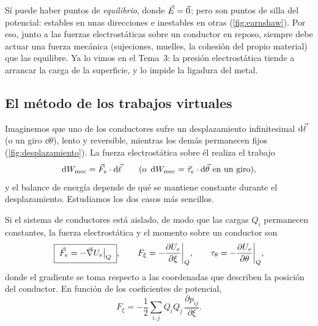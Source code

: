 \begin{observacion}\label{obs:silla}
Sí puede haber puntos de \emph{equilibrio}, donde $\vec E=\vec 0$; pero son puntos de silla del potencial: estables en unas direcciones e inestables
en otras (\cref{fig:earnshaw}). Por eso, junto a las fuerzas electrostáticas sobre un conductor en reposo, siempre debe actuar una fuerza
mecánica (sujeciones, muelles, la cohesión del propio material) que las equilibre. Ya lo vimos en el Tema~3: la presión electrostática tiende a
arrancar la carga de la superficie, y lo impide la ligadura del metal.
\end{observacion}



\subsection{El método de los trabajos virtuales}

Imaginemos que uno de los conductores sufre un desplazamiento infinitesimal $\mathop{}\!\mathrm{d}\vec\ell$ (o un giro $\dd\theta$), lento y reversible, mientras los
demás permanecen fijos (\cref{fig:desplazamiento}). La fuerza electrostática sobre él realiza el trabajo
\begin{equation}\label{eq:trabajo-mec}
  \mathop{}\!\mathrm{d}W_{\mathrm{mec}}=\vec F_e\cdot\mathop{}\!\mathrm{d}\vec\ell \qquad(\text{o } \mathop{}\!\mathrm{d}W_{\mathrm{mec}}=\vec\tau_e\cdot\mathop{}\!\mathrm{d}\vec\theta \text{ en un giro}),
\end{equation}
y el balance de energía depende de qué se mantiene constante durante el desplazamiento. Estudiamos los dos casos más sencillos.



\begin{teorema}\label{teo:fuerza-Q}
Si el sistema de conductores está aislado, de modo que las cargas $Q_i$ permanecen constantes, la fuerza electrostática y el momento sobre un
conductor son
\begin{equation}\label{eq:fuerza-Q}
  \boxed{\;\vec F_e=-\vec\nabla U_e\big|_{Q}\;},\qquad F_\xi=-\frac{\partial U_e}{\partial\xi}\bigg|_{Q},\qquad \tau_\theta=-\frac{\partial U_e}{\partial\theta}\bigg|_{Q},
\end{equation}
donde el gradiente se toma respecto a las coordenadas que describen la posición del conductor. En función de los coeficientes de potencial,
\begin{equation}\label{eq:fuerza-pij}
  F_\xi=-\frac12\sum_{i,j}Q_iQ_j\,\frac{\partial p_{ij}}{\partial\xi} .
\end{equation}
\end{teorema}

